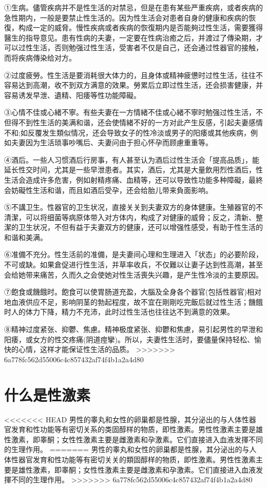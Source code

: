 \documentclass[12pt,UTF8]{ctexbook}
\begin{document}
①生病。儘管疾病并不是性生活的对禁忌，但是在患有某些严重疾病，或者疾病的急性期内，一般是要禁止性生活的。因为性生活会对患者自身的健康和疾病的恢復，构成一定的威脅。慢性疾病或者疾病的恢復期内是否能夠过性生活，需要獲得醫生的指导意见。患有性病的夫妻，一定要在性病治癒之后，并渡过了傳染期，才可以过性生活，否则勉强过性生活，受害者不仅是自己，还会通过性器官的接触，而将疾病傳染给对方。

②过度疲勞。性生活是要消耗很大体力的，且身体或精神疲憊时过性生活，往往不容易达到高潮，收不到双方满意的效果。勞累后立即过性生活，还会损害健康，并容易诱发早泄、遺精、阳痿等性功能障礙。

③心情不佳或心緒不寧。有些夫妻在一方情緒不佳或心緒不寧时勉强过性生活，不但得不到性生活的美满和谐，还会使情緒不好的一方对此产生反感，引起夫妻感情不和;如反覆发生類似情况，还会导致女子的性冷淡或男子的阳痿或其他疾病，例如夫妻因为生活琐事吵嘴后、夫妻问由于担心怀孕而顾慮重重等。

④酒后。一些人习惯酒后行房事，有人甚至认为酒后过性生活会「提高品质」，能延长性交时间，尤其是一些早泄患者。其实，酒后，尤其是大量飲用烈性酒后，性生活会造成许多危害，例如射精疼痛、血精等，还可以导致性功能多种障礙，最終会妨礙性生活和谐，而且如酒后受孕，还会给胎儿带来負面影响。

⑤不講卫生。性器官的卫生状况，直接关关到夫妻双方的身体健康。生殖器官的不清潔，可以将细菌等病原体带入对方体内，构成了对健康的威脅；反之，清新、整潔的卫生状况，不但有益于夫妻双方的健康，还可以增强性感受，有助于性生活的和谐和美满。

⑥准備不充分。性生活前的准備，是夫妻间心理和生理进入「状态」的必要阶段，不可或缺。如果倉促进行性生活，并草率收兵，不仅難以让妻子达到性高潮，甚至会给她带来痛苦，久而久之会使她对性生活喪失兴趣，是产生性冷淡的主要原因。

⑦飽食或饑餓时。飽食可以使胃肠道充盈，大腦及全身各个器官(包括性器官)相对地血液供应不足，影响阴茎的勃起程度，故不宜在剛剛吃完飯后就过性生活；饑餓时人的体力下降，精力不充沛，此时过性生活也往往达不到满意的效果。

⑧精神过度紧张、抑鬱、焦慮。精神极度紧张、抑鬱和焦慮，易引起男性的早泄和阳痿，或女方的性交疼痛(阴道痙攣)。所以，夫妻性生活时，要儘量保持轻松、愉快的心情，这样才能保证性生活的品质。
>>>>>>> 6a778fc562d55006c4c857432af74f4b1a2a4d80

\section{什么是性激素}

<<<<<<< HEAD
男性的睾丸和女性的卵巢都是性腺，其分泌出的与人体性器官发育和性功能等有密切关系的类固醇样的物质，即性激素。男性性激素主要是雄性激素，即睾酮；女性性激素主要是雌激素和孕激素。它们直接进入血液发揮不同的生理作用。
=======
男性的睾丸和女性的卵巢都是性腺，其分泌出的与人体性器官发育和性功能等有密切关关的類固醇样的物质，即性激素。男性性激素主要是雄性激素，即睾酮；女性性激素主要是雌激素和孕激素。它们直接进入血液发揮不同的生理作用。
>>>>>>> 6a778fc562d55006c4c857432af74f4b1a2a4d80
\end{document}
